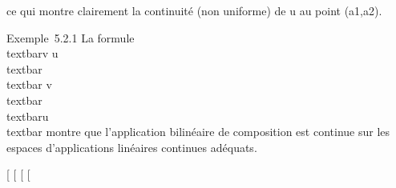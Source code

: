 ce qui montre clairement la continuité (non uniforme) de u au point
(a1,a2).

Exemple~5.2.1 La formule \\textbar{}v \cdot
u\\textbar{} \leq\\textbar{}
v\\textbar{}\,\\textbar{}u\\textbar{}
montre que l'application bilinéaire de composition est continue sur les
espaces d'applications linéaires continues adéquats.

{[}
{[}
{[}
{[}
